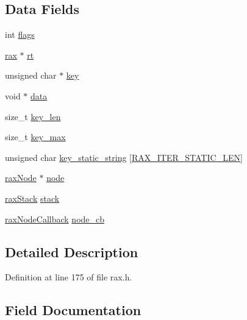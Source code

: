 \subsection*{Data Fields}
\begin{DoxyCompactItemize}
\item 
int \hyperlink{structrax_iterator_ac8bf36fe0577cba66bccda3a6f7e80a4}{flags}
\item 
\hyperlink{structrax}{rax} $\ast$ \hyperlink{structrax_iterator_a58939ec4439701d170853cf158043d57}{rt}
\item 
unsigned char $\ast$ \hyperlink{structrax_iterator_a1cb5ee363f3d6d0f548eb6e64d72a7c8}{key}
\item 
void $\ast$ \hyperlink{structrax_iterator_a735984d41155bc1032e09bece8f8d66d}{data}
\item 
size\+\_\+t \hyperlink{structrax_iterator_aaa2dc552577da2bba064c4d36d971c26}{key\+\_\+len}
\item 
size\+\_\+t \hyperlink{structrax_iterator_a7e65a3134205dfce4a447bc3359f1a07}{key\+\_\+max}
\item 
unsigned char \hyperlink{structrax_iterator_a5854437e7714a04ea59691e0e5167883}{key\+\_\+static\+\_\+string} \mbox{[}\hyperlink{rax_8h_a172e740ce3572b21018192e7877217dd}{R\+A\+X\+\_\+\+I\+T\+E\+R\+\_\+\+S\+T\+A\+T\+I\+C\+\_\+\+L\+EN}\mbox{]}
\item 
\hyperlink{structrax_node}{rax\+Node} $\ast$ \hyperlink{structrax_iterator_ae2c06018ed6b76e72dd8b8372011afa5}{node}
\item 
\hyperlink{structrax_stack}{rax\+Stack} \hyperlink{structrax_iterator_ad25901300905129025788c7c8f27cb8e}{stack}
\item 
\hyperlink{rax_8h_a08d5db58149f8656e7f4d046b70a4ef1}{rax\+Node\+Callback} \hyperlink{structrax_iterator_af80d4e8e6dcdfdb2c80c37457122426c}{node\+\_\+cb}
\end{DoxyCompactItemize}


\subsection{Detailed Description}


Definition at line 175 of file rax.\+h.



\subsection{Field Documentation}
\mbox{\label{structrax_iterator_a735984d41155bc1032e09bece8f8d66d}} 
